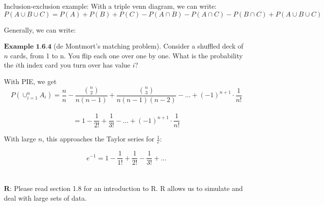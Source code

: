 \documentclass{article}
\begin{document}
    Inclusion-exclusion example: With a triple venn diagram, we can write:
    $$P(A\cup B\cup C)=P(A)+P(B)+P(C) - P(A\cap B)-P(A\cap C)-P(B\cap C)+P(A\cup B \cup C)$$
    
    Generally, we can write:



    $\textbf{Example 1.6.4}$ (de Montmort's matching problem). Consider a shuffled deck of $n$ cards, from 1 to n.
    You flip each one over one by one. What is the probability the $i$th index card
    you turn over has value $i$?

    With PIE, we get $$P(\cup_{i=1}^n A_i)=\frac{n}{n}-\frac{{n\choose 2}}{n(n-1)}
    +\frac{{n\choose 3}}{n(n-1)(n-2)}- ...+(-1)^{n+1}\cdot\frac{1}{n!}$$\\
    $$= 1-\frac{1}{2!}+\frac{1}{3!}-...+(-1)^{n+1}\cdot\frac{1}{n!}$$

    With large $n$, this approaches the Taylor series for $\frac{1}{e}$:

    $$e^{-1}=1-\frac{1}{1!}+\frac{1}{2!}-\frac{1}{3!}+...$$\\\\

    $\textbf{R}$: Please read section 1.8 for an introduction to R. R allows us to simulate and deal with large sets of data.

        


    
\end{document}
